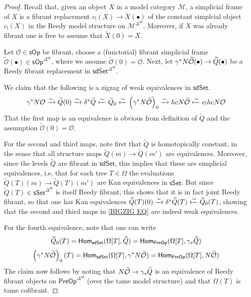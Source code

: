 \documentclass[a4paper,10pt
,draft
]{article}%
\renewcommand{\1}{\eta}%
\begin{document}
\begin{proof}
	Recall that, given an object $X$ in a model category $\mathcal{M}$, a simplicial frame of $X$ is a fibrant replacement
	$c_!(X) \to \widetilde{X}(\bullet)$ of the constant 
	simplcial object $c_!(X)$ in the Reedy model structure on $\mathcal{M}^{\Delta^{op}}$.
	Moreover, if $X$ was already fibrant one is free to assume that $\widetilde{X}(0) = X$.
	
	Let $\mathcal{O} \in \mathsf{sOp}$ be fibrant, 
	choose a (functorial) fibrant simplicial frame
	$\widetilde{\mathcal{O}}(\bullet) \in \mathsf{sOp}^{\Delta^{op}}$, where we assume $\widetilde{\mathcal{O}} (0) = \mathcal{O}$.
	Next, let 
	$\gamma^{\**} N \widetilde{\mathcal{O}}(\bullet) 
	\to \widetilde{Q}(\bullet)$
	be a Reedy fibrant replacement in  
	$\mathsf{sdSet}^{\Delta^{op}}$.
	
	We claim that the following is a zigzag of weak equivalences in $\mathsf{sdSet}$.
\begin{equation}\label{BIGZIG EQ}
	\gamma^{\**} N \mathcal{O} \xrightarrow{\sim}
	\widetilde{Q}(0) \xrightarrow{\sim}
	\delta^{\**} \widetilde{Q} \xleftarrow{\sim}
	\widetilde{Q}_0 \xleftarrow{\sim}
	\left(\gamma^{\**} N \widetilde{\mathcal{O}}\right)_0
	\xrightarrow{\sim}
	hcN \widetilde{\mathcal{O}} \xleftarrow{\sim}
	c_{!} hcN \mathcal{O}
\end{equation}
That the first map is an equivalence is obvious from definition of $\widetilde{Q}$ and the assumption $\widetilde{\mathcal{O}}(0) = \mathcal{O}$.

For the second and third maps, note first that $\widetilde{Q}$ is homotopically constant, in the sense that all structure maps $\widetilde{Q}(m) \to \widetilde{Q}(m')$
are equivalences.
Moreover, since the levels $\widetilde{Q}$ are fibrant in 
$\mathsf{sdSet}$, this implies that these are simplicial equivalences, i.e. that for each tree $T \in \Omega$
the evaluations 
$\widetilde{Q}(T)(m) \to \widetilde{Q}(T)(m')$
are Kan equivalences in $\mathsf{sSet}$.
But since $\widetilde{Q}(T) \in \mathsf{sSet}^{\Delta^{op}}$ is itself Reedy fibrant, this shows that it is in fact joint Reedy fibrant, so that one has Kan equivalences 
$\widetilde{Q}(T)(0) \xrightarrow{\sim}
\delta^{\**} \widetilde{Q}(T) \xleftarrow{\sim}
\widetilde{Q}_0(T)$, showing that the second and third maps in \eqref{BIGZIG EQ} are indeed weak equivalences.

For the fourth equivalence, note that one can write
\[\widetilde{Q}_0(T) = 
\mathsf{Hom}_{\mathsf{sdSet}}(\Omega[T],\widetilde{Q})=
\mathsf{Hom}_{\mathsf{PreOp}}(\Omega[T],\gamma_{\**}\widetilde{Q})\]
\[
\left(\gamma^{\**} N \widetilde{\mathcal{O}}\right)_0(T) = 
\mathsf{Hom}_{\mathsf{sdSet}}(\Omega[T],\gamma^{\**} N \widetilde{\mathcal{O}})=
\mathsf{Hom}_{\mathsf{PreOp}}(\Omega[T], N \widetilde{\mathcal{O}})
\]
The claim now follows by noting that
$N \widetilde{\mathcal{O}} \to \gamma_{\**} \widetilde{Q}$
is an equivalence of Reedy fibrant objects on 
$\mathsf{PreOp}^{\Delta^{op}}$ (over the tame model structure) and that $\Omega(T)$ is tame cofibrant. 


\end{proof}
\end{document}
